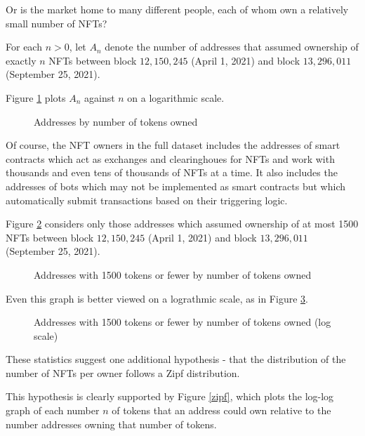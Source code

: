\documentclass{article}
\begin{document}
Or is the market home to many different people, each of whom own a relatively small number of NFTs?

For each $n > 0$, let $A_n$ denote the number of addresses that assumed ownership of exactly $n$ NFTs between block $12,150,245$ (April 1, 2021) and block $13,296,011$ (September 25, 2021).

Figure \ref{tokens-owned-per-address-logarithmic} plots $A_n$ against $n$ on a logarithmic scale.

\begin{figure}
\caption{Addresses by number of tokens owned}\label{tokens-owned-per-address-logarithmic}
\end{figure}

Of course, the NFT owners in the full dataset includes the addresses of smart contracts which act as exchanges and clearinghoues for NFTs and work with thousands and even tens of thousands of NFTs at a time. It also includes the addresses of bots which may not be implemented as smart contracts but which automatically submit transactions based on their triggering logic.

Figure \ref{tokens-owned-per-address-logarithmic-low-scale} considers only those addresses which assumed ownership of at most 1500 NFTs between block $12,150,245$ (April 1, 2021) and block $13,296,011$ (September 25, 2021).

\begin{figure}
\caption{Addresses with 1500 tokens or fewer by number of tokens owned}\label{tokens-owned-per-address-logarithmic-low-scale}
\end{figure}

Even this graph is better viewed on a lograthmic scale, as in Figure \ref{tokens-owned-per-address-logarithmic-log-low-scale}.

\begin{figure}
\caption{Addresses with 1500 tokens or fewer by number of tokens owned (log scale)}\label{tokens-owned-per-address-logarithmic-log-low-scale}
\end{figure}

These statistics suggest one additional hypothesis - that the distribution of the number of NFTs per owner follows a Zipf distribution.

This hypothesis is clearly supported \cite{powers-zipf} by Figure \ref{zipf}, which plots the log-log graph of each number $n$ of tokens that an address could own relative to the number addresses owning that number of tokens.
\end{document}
